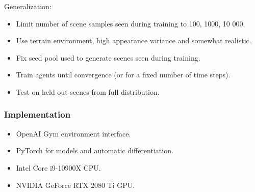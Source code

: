 \begin{frame}
    Generalization:

    \begin{itemize}
        \item Limit number of scene samples seen during training to 100, 1000, 10 000.
        \item Use terrain environment, high appearance variance and somewhat realistic.
        \item Fix seed pool used to generate scenes seen during training.
        \item Train agents until convergence (or for a fixed number of time steps).
        \item Test on held out scenes from full distribution. 
    \end{itemize}
\end{frame}

\begin{frame}
    \frametitle{Implementation}

    \begin{itemize}
        \item OpenAI Gym environment interface.
        \item PyTorch for models and automatic differentiation.
        \item Intel Core i9-10900X CPU.
        \item NVIDIA GeForce RTX 2080 Ti GPU.
    \end{itemize}
\end{frame}